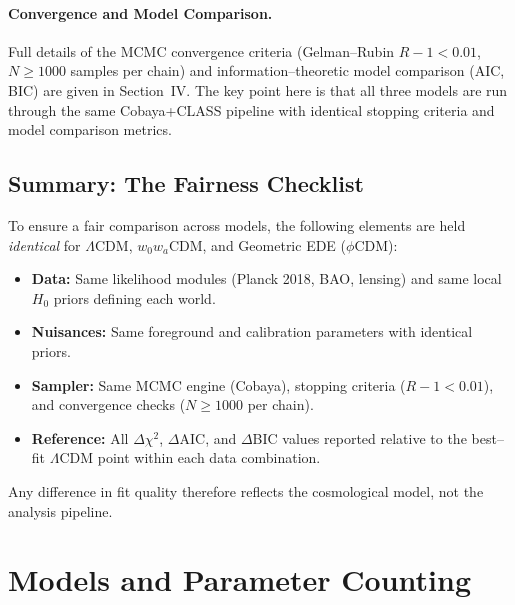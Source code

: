 \documentclass[a4paper,11pt]{article}
\begin{document}
\paragraph{Convergence and Model Comparison.}
Full details of the MCMC convergence criteria (Gelman--Rubin $R - 1 < 0.01$, $N \geq 1000$ samples per chain) and information--theoretic model comparison (AIC, BIC) are given in Section~IV. The key point here is that all three models are run through the same Cobaya+CLASS pipeline with identical stopping criteria and model comparison metrics.


\subsection{Summary: The Fairness Checklist}
\label{sec:fairness}

To ensure a fair comparison across models, the following elements are held \emph{identical} for $\Lambda$CDM, $w_0 w_a$CDM, and Geometric EDE ($\phi$CDM):

\begin{itemize}
    \item \textbf{Data:} Same likelihood modules (Planck 2018, BAO, lensing) and same local $H_0$ priors defining each world.
    \item \textbf{Nuisances:} Same foreground and calibration parameters with identical priors.
    \item \textbf{Sampler:} Same MCMC engine (Cobaya), stopping criteria ($R - 1 < 0.01$), and convergence checks ($N \geq 1000$ per chain).
    \item \textbf{Reference:} All $\Delta\chi^2$, $\Delta$AIC, and $\Delta$BIC values reported relative to the best--fit $\Lambda$CDM point within each data combination.
\end{itemize}

Any difference in fit quality therefore reflects the cosmological model, not the analysis pipeline.


\section{Models and Parameter Counting}
\end{document}
